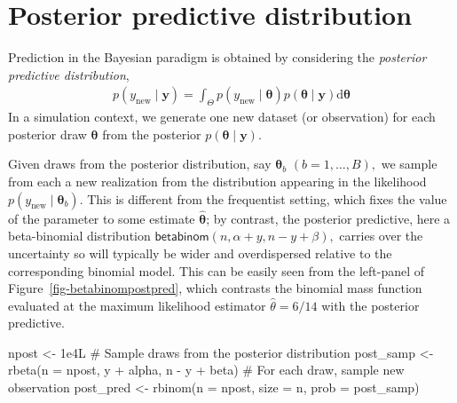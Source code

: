 \documentclass[
  11pt,
  letterpaper,
]{scrbook}
\newenvironment{Shaded}{\begin{snugshade}}{\end{snugshade}}
\newcommand{\AttributeTok}[1]{\textcolor[rgb]{0.40,0.45,0.13}{#1}}
\newcommand{\CommentTok}[1]{\textcolor[rgb]{0.37,0.37,0.37}{#1}}
\newcommand{\FloatTok}[1]{\textcolor[rgb]{0.68,0.00,0.00}{#1}}
\newcommand{\FunctionTok}[1]{\textcolor[rgb]{0.28,0.35,0.67}{#1}}
\newcommand{\NormalTok}[1]{\textcolor[rgb]{0.00,0.23,0.31}{#1}}
\newcommand{\OtherTok}[1]{\textcolor[rgb]{0.00,0.23,0.31}{#1}}
\newcommand{\SpecialCharTok}[1]{\textcolor[rgb]{0.37,0.37,0.37}{#1}}
\theoremstyle{definition}
\theoremstyle{plain}
\theoremstyle{plain}
\theoremstyle{plain}
\theoremstyle{definition}
\theoremstyle{definition}
\theoremstyle{remark}
\begin{document}
\section{Posterior predictive
distribution}\label{posterior-predictive-distribution}

Prediction in the Bayesian paradigm is obtained by considering the
\emph{posterior predictive distribution}, \begin{align*}
p(y_{\text{new}} \mid \boldsymbol{y}) =
\int_{\Theta} p(y_{\text{new}}  \mid \boldsymbol{\theta}) p(\boldsymbol{\theta} \mid  \boldsymbol{y}) \mathrm{d} \boldsymbol{\theta}
\end{align*} In a simulation context, we generate one new dataset (or
observation) for each posterior draw \(\boldsymbol{\theta}\) from the
posterior \(p(\boldsymbol{\theta} \mid  \boldsymbol{y}).\)

Given draws from the posterior distribution, say
\(\boldsymbol{\theta}_b\) \((b=1, \ldots, B),\) we sample from each a
new realization from the distribution appearing in the likelihood
\(p(y_{\text{new}}  \mid \boldsymbol{\theta}_b).\) This is different
from the frequentist setting, which fixes the value of the parameter to
some estimate \(\widehat{\boldsymbol{\theta}}\); by contrast, the
posterior predictive, here a beta-binomial distribution
\(\mathsf{beta binom}(n, \alpha + y, n - y + \beta),\) carries over the
uncertainty so will typically be wider and overdispersed relative to the
corresponding binomial model. This can be easily seen from the
left-panel of Figure~\ref{fig-betabinompostpred}, which contrasts the
binomial mass function evaluated at the maximum likelihood estimator
\(\widehat{\theta}=6/14\) with the posterior predictive.

\begin{Shaded}
\begin{Highlighting}[]
\NormalTok{npost }\OtherTok{\textless{}{-}} \FloatTok{1e4}\NormalTok{L}
\CommentTok{\# Sample draws from the posterior distribution}
\NormalTok{post\_samp }\OtherTok{\textless{}{-}} \FunctionTok{rbeta}\NormalTok{(}\AttributeTok{n =}\NormalTok{ npost, y }\SpecialCharTok{+}\NormalTok{ alpha, n }\SpecialCharTok{{-}}\NormalTok{ y }\SpecialCharTok{+}\NormalTok{ beta)}
\CommentTok{\# For each draw, sample new observation}
\NormalTok{post\_pred }\OtherTok{\textless{}{-}} \FunctionTok{rbinom}\NormalTok{(}\AttributeTok{n =}\NormalTok{ npost, }\AttributeTok{size =}\NormalTok{ n, }\AttributeTok{prob =}\NormalTok{ post\_samp)}
\end{Highlighting}
\end{Shaded}
\end{document}
